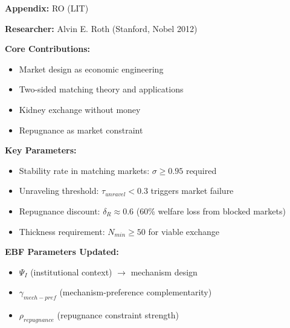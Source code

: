 \begin{tcolorbox}[colback=gray!5!white,colframe=gray!75!black,title=Quick Reference]
\textbf{Appendix:} RO (LIT)

\textbf{Researcher:} Alvin E. Roth (Stanford, Nobel 2012)

\textbf{Core Contributions:}
\begin{itemize}
    \item Market design as economic engineering
    \item Two-sided matching theory and applications
    \item Kidney exchange without money
    \item Repugnance as market constraint
\end{itemize}

\textbf{Key Parameters:}
\begin{itemize}
    \item Stability rate in matching markets: $\sigma \geq 0.95$ required
    \item Unraveling threshold: $\tau_{unravel} < 0.3$ triggers market failure
    \item Repugnance discount: $\delta_R \approx 0.6$ (60\% welfare loss from blocked markets)
    \item Thickness requirement: $N_{min} \geq 50$ for viable exchange
\end{itemize}

\textbf{EBF Parameters Updated:}
\begin{itemize}
    \item $\Psi_I$ (institutional context) $\rightarrow$ mechanism design
    \item $\gamma_{mech-pref}$ (mechanism-preference complementarity)
    \item $\rho_{repugnance}$ (repugnance constraint strength)
\end{itemize}
\end{tcolorbox}


